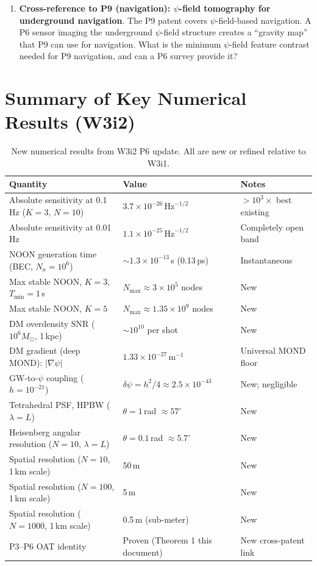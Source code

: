\documentclass[11pt]{article}
\theoremstyle{definition}
\theoremstyle{remark}
\begin{document}
\begin{enumerate}
\item \textbf{Cross-reference to P9 (navigation): $\psi$-field tomography
  for underground navigation}.
  The P9 patent covers $\psi$-field-based navigation. A P6 sensor
  imaging the underground $\psi$-field structure creates a ``gravity
  map'' that P9 can use for navigation. What is the minimum $\psi$-field
  feature contrast needed for P9 navigation, and can a P6 survey
  provide it?

\end{enumerate}

\section*{Summary of Key Numerical Results (W3i2)}

\begin{table}[h]
\centering
\caption{New numerical results from W3i2 P6 update. All are new or
refined relative to W3i1.}
\begin{tabular}{@{}p{6.5cm}ll@{}}
\toprule
Quantity & Value & Notes \\
\midrule
Absolute sensitivity at 0.1\,Hz ($K=3$, $N=10$)
  & $3.7\times10^{-26}\,\mathrm{Hz}^{-1/2}$
  & $>10^3\times$ best existing \\
Absolute sensitivity at 0.01\,Hz
  & $1.1\times10^{-25}\,\mathrm{Hz}^{-1/2}$
  & Completely open band \\
NOON generation time (BEC, $N_a=10^6$)
  & $\sim 1.3\times10^{-13}$\,s (0.13\,ps)
  & Instantaneous \\
Max stable NOON, $K=3$, $T_{\min}=1$\,s
  & $N_{\max} \approx 3\times10^5$ nodes
  & New \\
Max stable NOON, $K=5$
  & $N_{\max} \approx 1.35\times10^9$ nodes
  & New \\
DM overdensity SNR ($10^6 M_\odot$, 1\,kpc)
  & $\sim 10^{10}$ per shot
  & New \\
DM gradient (deep MOND): $|\nabla\psi|$
  & $1.33\times10^{-27}$\,m$^{-1}$
  & Universal MOND floor \\
GW-to-$\psi$ coupling ($h=10^{-21}$)
  & $\delta\psi = h^2/4 \approx 2.5\times10^{-43}$
  & New; negligible \\
Tetrahedral PSF, HPBW ($\lambda=L$)
  & $\theta = 1$\,rad $\approx 57^\circ$
  & New \\
Heisenberg angular resolution ($N=10$, $\lambda = L$)
  & $\theta = 0.1$\,rad $\approx 5.7^\circ$
  & New \\
Spatial resolution ($N=10$, 1\,km scale)
  & 50\,m
  & New \\
Spatial resolution ($N=100$, 1\,km scale)
  & 5\,m
  & New \\
Spatial resolution ($N=1000$, 1\,km scale)
  & 0.5\,m (sub-meter)
  & New \\
P3--P6 OAT identity
  & Proven (Theorem 1 this document)
  & New cross-patent link \\
\bottomrule
\end{tabular}
\end{table}
\end{document}
